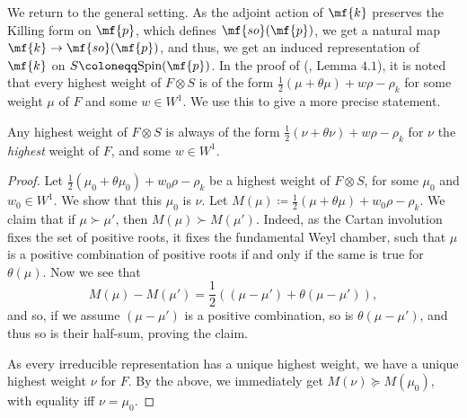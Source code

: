 \noindent We return to the general setting. As the adjoint action of $\mf{k}$ preserves the Killing form on $\mf{p}$, which defines $\mf{so}(\mf{p})$, we get a natural map $\mf{k}\to\mf{so}(\mf{p})$, and thus, we get an induced representation of $\mf{k}$ on $S\coloneqq\text{Spin}(\mf{p})$. In the proof of (\cite{BV}, Lemma $4.1$), it is noted that every highest weight of $F\otimes S$ is of the form $\frac12(\mu+\theta\mu)+w\rho-\rho_k$ for some weight $\mu$ of $F$ and some $w\in W^1$. We use this to give a more precise statement.

\begin{lem}\label{weight}
    Any highest weight of $F\otimes S$ is always of the form $\frac12(\nu+\theta\nu)+w\rho-\rho_k$ for $\nu$ the \textit{highest} weight of $F$, and some $w\in W^1$.
\end{lem}

\begin{proof}
    Let $\frac12(\mu_0+\theta\mu_0)+w_0\rho-\rho_k$ be a highest weight of $F\otimes S$, for some $\mu_0$ and $w_0\in W^1$. We show that this $\mu_0$ is $\nu$. Let $M(\mu)\coloneqq \frac12(\mu+\theta\mu)+w_0\rho-\rho_k$. We claim that if $\mu\succ \mu'$, then $M(\mu)\succ M(\mu')$. Indeed, as the Cartan involution fixes the set of positive roots, it fixes the fundamental Weyl chamber, such that $\mu$ is a positive combination of positive roots if and only if the same is true for $\theta(\mu)$. Now we see that
    $$M(\mu)-M(\mu') = \frac12((\mu-\mu')+\theta(\mu-\mu')),$$
    and so, if we assume $(\mu-\mu')$ is a positive combination, so is $\theta(\mu-\mu')$, and thus so is their half-sum, proving the claim. 
    
    As every irreducible representation has a unique highest weight, we have a unique highest weight $\nu$ for $F$. By the above, we immediately get $M(\nu)\succeq M(\mu_0)$, with equality iff $\nu=\mu_0$.
\end{proof}


